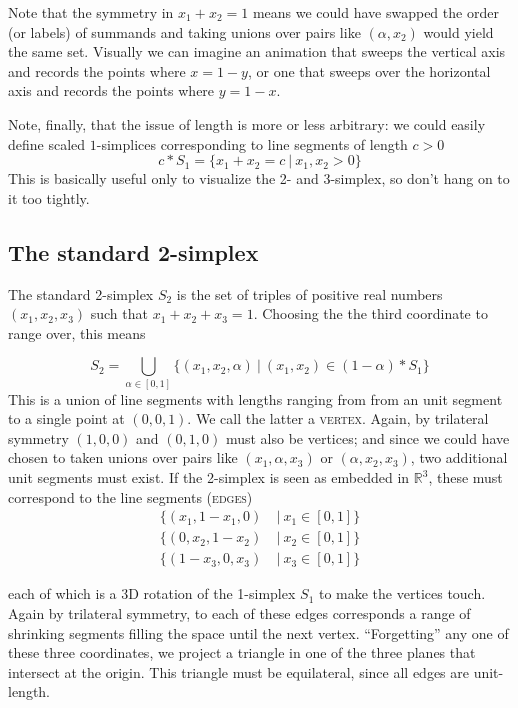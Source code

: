 \documentclass{tufte-handout}
\newcommand{\define}{\textsc}
\newcommand{\re}{\mathbb{R}}
\begin{document}
Note that the symmetry in $x_1+x_2=1$ means we could have swapped the order (or labels) of summands and taking unions over pairs like $(\alpha,x_2)$ would yield the same set. Visually we can imagine an animation that sweeps the vertical axis and records the points where $x=1-y$, or one that sweeps over the horizontal axis and records the points where $y=1-x$.

Note, finally, that the issue of length is more or less arbitrary: we could easily define scaled $1$-simplices corresponding to line segments of length $c>0$
\[
c * S_1 = \{x_1 + x_2 = c\ |\ x_1,x_2>0\}
\]
This is basically useful only to visualize the 2- and 3-simplex, so don't hang on to it too tightly.

\subsection{The standard 2-simplex}
The standard 2-simplex $S_2$ is the set of triples of positive real numbers $(x_1,x_2,x_3)$ such that $x_1+x_2+x_3=1$. Choosing the the third coordinate to range over, this means

\begin{equation}
    S_2 =  \bigcup_{\alpha\in[0,1]} \{(x_1,x_2,\alpha)\ |\ (x_1,x_2)\in (1-\alpha)*S_1\}
    \label{union-view-2}
\end{equation}
This is a union of line segments with lengths ranging from from an unit segment to a single point at $(0,0,1)$. We call the latter a \define{vertex}. Again, by trilateral symmetry $(1,0,0)$ and $(0,1,0)$ must also be vertices; and since we could have chosen to taken unions over pairs like $(x_1, \alpha,x_3)$ or $(\alpha,x_2,x_3)$, two additional unit segments must exist. If the 2-simplex is seen as embedded in $\re^3$, these must correspond to the line segments (\define{edges})
\begin{align*}
\{(x_1,1-x_1,0)\ &|\  x_1\in[0,1]\}\\
\{(0,x_2,1-x_2)\ &|\ x_2 \in[0,1]\}\\
\{(1-x_3,0,x_3)\ &|\ x_3\in[0,1]\}
\end{align*}

each of which is a 3D rotation of the 1-simplex $S_1$ to make the vertices touch. Again by trilateral symmetry, to each of these edges corresponds a range of shrinking segments filling the space until the next vertex. ``Forgetting'' any one of these three coordinates, we project a triangle in one of the three planes that intersect at the origin. This triangle must be equilateral, since all edges are unit-length.
\end{document}
